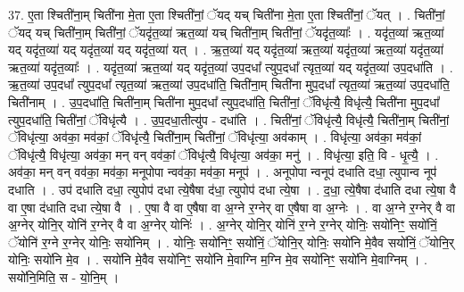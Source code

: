 \documentclass[17pt]{extarticle}
\begin{document}
37. ए॒ता श्चिती॑ना॒म् चिती॑ना मे॒ता ए॒ता श्चिती॑नां॒ ॅयद् यच् चिती॑ना मे॒ता ए॒ता श्चिती॑नां॒ ॅयत् । . चिती॑नां॒ ॅयद् यच् चिती॑ना॒म् चिती॑नां॒ ॅयदृ॑त॒व्या॑ ऋत॒व्या॑ यच् चिती॑ना॒म् चिती॑नां॒ ॅयदृ॑त॒व्याः᳚ । . यदृ॑त॒व्या॑ ऋत॒व्या॑ यद् यदृ॑त॒व्या॑ यद् यदृ॑त॒व्या॑ यद् यदृ॑त॒व्या॑ यत् । . ऋ॒त॒व्या॑ यद् यदृ॑त॒व्या॑ ऋत॒व्या॑ यदृ॑त॒व्या॑ ऋत॒व्या॑ यदृ॑त॒व्या॑ ऋत॒व्या॑ यदृ॑त॒व्याः᳚ । . यदृ॑त॒व्या॑ ऋत॒व्या॑ यद् यदृ॑त॒व्या॑ उप॒दधा᳚ त्युप॒दधा᳚ त्यृत॒व्या॑ यद् यदृ॑त॒व्या॑ उप॒दधा॑ति । . ऋ॒त॒व्या॑ उप॒दधा᳚ त्युप॒दधा᳚ त्यृत॒व्या॑ ऋत॒व्या॑ उप॒दधा॑ति॒ चिती॑ना॒म् चिती॑ना मुप॒दधा᳚ त्यृत॒व्या॑ ऋत॒व्या॑ उप॒दधा॑ति॒ चिती॑नाम् । . उ॒प॒दधा॑ति॒ चिती॑ना॒म् चिती॑ना मुप॒दधा᳚ त्युप॒दधा॑ति॒ चिती॑नां॒ ॅविधृ॑त्यै॒ विधृ॑त्यै॒ चिती॑ना मुप॒दधा᳚ त्युप॒दधा॑ति॒ चिती॑नां॒ ॅविधृ॑त्यै । . उ॒प॒दधा॒तीत्यु॑प - दधा॑ति । . चिती॑नां॒ ॅविधृ॑त्यै॒ विधृ॑त्यै॒ चिती॑ना॒म् चिती॑नां॒ ॅविधृ॑त्या॒ अव॑का॒ मव॑कां॒ ॅविधृ॑त्यै॒ चिती॑ना॒म् चिती॑नां॒ ॅविधृ॑त्या॒ अव॑काम् । . विधृ॑त्या॒ अव॑का॒ मव॑कां॒ ॅविधृ॑त्यै॒ विधृ॑त्या॒ अव॑का॒ मन् वन् वव॑कां॒ ॅविधृ॑त्यै॒ विधृ॑त्या॒ अव॑का॒ मनु॑ । . विधृ॑त्या॒ इति॒ वि - धृ॒त्यै॒ । . अव॑का॒ मन् वन् वव॑का॒ मव॑का॒ मनूपोपा न्वव॑का॒ मव॑का॒ मनूप॑ । . अनूपोपा न्वनूप॑ दधाति दधा॒ त्युपान्व नूप॑ दधाति । . उप॑ दधाति दधा॒ त्युपोप॑ दधा त्ये॒षैषा द॑धा॒ त्युपोप॑ दधा त्ये॒षा । . द॒धा॒ त्ये॒षैषा द॑धाति दधा त्ये॒षा वै वा ए॒षा द॑धाति दधा त्ये॒षा वै । . ए॒षा वै वा ए॒षैषा वा अ॒ग्ने र॒ग्नेर् वा ए॒षैषा वा अ॒ग्नेः । . वा अ॒ग्ने र॒ग्नेर् वै वा अ॒ग्नेर् योनि॒र् योनि॑ र॒ग्नेर् वै वा अ॒ग्नेर् योनिः॑ । . अ॒ग्नेर् योनि॒र् योनि॑ र॒ग्ने र॒ग्नेर् योनिः॒ सयो॑निꣳ॒॒ सयो॑निं॒ ॅयोनि॑ र॒ग्ने र॒ग्नेर् योनिः॒ सयो॑निम् । . योनिः॒ सयो॑निꣳ॒॒ सयो॑निं॒ ॅयोनि॒र् योनिः॒ सयो॑नि मे॒वैव सयो॑निं॒ ॅयोनि॒र् योनिः॒ सयो॑नि मे॒व । . सयो॑नि मे॒वैव सयो॑निꣳ॒॒ सयो॑नि मे॒वाग्नि म॒ग्नि मे॒व सयो॑निꣳ॒॒ सयो॑नि मे॒वाग्निम् । . सयो॑नि॒मिति॒ स - यो॒नि॒म् । \newline
\pagebreak
{}
\end{document}

